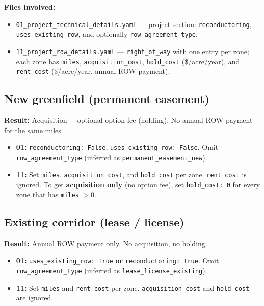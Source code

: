 \documentclass[ctcc_full_documentation.tex]{subfiles}
\begin{document}
\textbf{Files involved:}
\begin{itemize}
    \item \texttt{01\_project\_technical\_details.yaml} --- project section: \texttt{reconductoring}, \texttt{uses\_existing\_row}, and optionally \texttt{row\_agreement\_type}.
    \item \texttt{11\_project\_row\_details.yaml} --- \texttt{right\_of\_way} with one entry per zone; each zone has \texttt{miles}, \texttt{acquisition\_cost}, \texttt{hold\_cost} (\$/acre/year), and \texttt{rent\_cost} (\$/acre/year, annual ROW payment).
\end{itemize}

\subsection{New greenfield (permanent easement)}

\textbf{Result:} Acquisition + optional option fee (holding). No annual ROW payment for the same miles.

\begin{itemize}
    \item \textbf{01:} \texttt{reconductoring: False}, \texttt{uses\_existing\_row: False}. Omit \texttt{row\_agreement\_type} (inferred as \texttt{permanent\_easement\_new}).
    \item \textbf{11:} Set \texttt{miles}, \texttt{acquisition\_cost}, and \texttt{hold\_cost} per zone. \texttt{rent\_cost} is ignored. To get \textbf{acquisition only} (no option fee), set \texttt{hold\_cost: 0} for every zone that has \texttt{miles} $> 0$.
\end{itemize}

\subsection{Existing corridor (lease / license)}

\textbf{Result:} Annual ROW payment only. No acquisition, no holding.

\begin{itemize}
    \item \textbf{01:} \texttt{uses\_existing\_row: True} \textbf{or} \texttt{reconductoring: True}. Omit \texttt{row\_agreement\_type} (inferred as \texttt{lease\_license\_existing}).
    \item \textbf{11:} Set \texttt{miles} and \texttt{rent\_cost} per zone. \texttt{acquisition\_cost} and \texttt{hold\_cost} are ignored.
\end{itemize}
\end{document}
